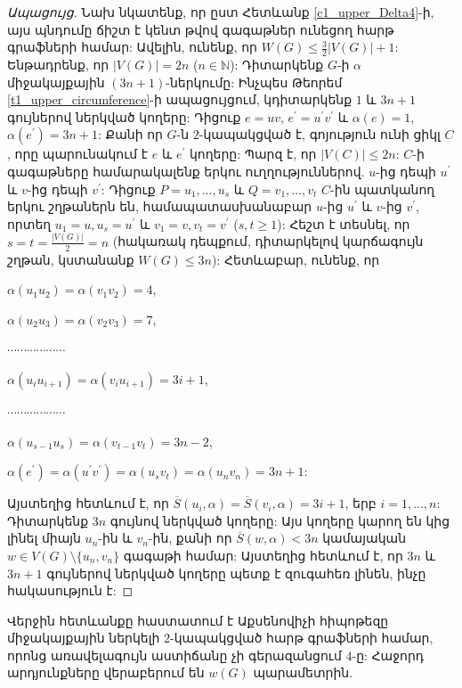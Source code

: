 \begin{proof}[Ապացույց] Նախ նկատենք, որ ըստ Հետևանք \ref{c1_upper_Delta4}-ի, այս պնդումը ճիշտ է կենտ թվով գագաթներ ունեցող հարթ գրաֆների համար: Ավելին, ունենք, որ $W(G)\leq \frac{3}{2}\vert V(G)\vert+1$: Ենթադրենք, որ $\vert V(G)\vert =2n$ ($n\in \mathbb{N}$): Դիտարկենք $G$-ի $\alpha$ միջակայքային $(3n+1)$-ներկումը:
Ինչպես Թեորեմ \ref{t1_upper_circumference}-ի ապացույցում, կդիտարկենք $1$ և $3n+1$ գույներով ներկված կողերը: Դիցուք $e=uv$, $e^{\prime}=u^{\prime}v^{\prime}$ և $\alpha(e)=1$,
$\alpha(e^{\prime})=3n+1$: Քանի որ $G$-ն $2$-կապակցված է, գոյություն ունի ցիկլ $C$, որը պարունակում է $e$ և $e^{\prime}$ կողերը: 
Պարզ է, որ $\vert V(C)\vert\leq 2n$: 
$C$-ի գագաթները համարակալենք երկու ուղղություններով. $u$-ից դեպի
$u^{\prime}$ և $v$-ից դեպի $v^{\prime}$: Դիցուք
$P=u_{1},\ldots,u_{s}$ և $Q=v_{1},\ldots,v_{t}$ $C$-ին պատկանող երկու շղթաներն են, համապատասխանաբար $u$-ից $u^{\prime}$ և $v$-ից $v^{\prime}$, որտեղ
$u_{1}=u,u_{s}=u^{\prime}$ և $v_{1}=v,v_{t}=v^{\prime}$
($s,t\geq 1$): Հեշտ է տեսնել, որ
$s=t=\frac{\vert V(G)\vert}{2}=n$ (հակառակ դեպքում, դիտարկելով կարճագույն շղթան, կստանանք $W(G)\leq 3n$): Հետևաբար, ունենք, որ

\begin{center}
$\alpha(u_{1}u_{2})=\alpha(v_{1}v_{2})=4$,

$\alpha(u_{2}u_{3})=\alpha(v_{2}v_{3})=7$,

$\cdots \cdots \cdots \cdots \cdots \cdots$

$\alpha(u_{i}u_{i+1})=\alpha(v_{i}u_{i+1})=3i+1$,

$\cdots \cdots \cdots \cdots \cdots \cdots$

$\alpha(u_{s-1}u_{s})=\alpha(v_{t-1}v_{t})=3n-2$,

$\alpha(e^{\prime})=\alpha(u^{\prime}v^{\prime})=\alpha(u_{s}v_{t})=\alpha(u_{n}v_{n})=3n+1$:
\end{center}

Այստեղից հետևում է, որ $\overline S\left(u_{i},\alpha\right)=\overline
S\left(v_{i},\alpha\right)=3i+1$, երբ $i=1,\ldots,n$: Դիտարկենք $3n$ գույնով ներկված կողերը: Այս կողերը կարող են կից լինել միայն $u_{n}$-ին և $v_{n}$-ին, քանի որ 
$\overline S\left(w,\alpha\right)<3n$ կամայական 
$w\in V(G)\setminus\{u_{n},v_{n}\}$ գագաթի համար: Այստեղից հետևում է, որ $3n$ և $3n+1$ գույներով ներկված կողերը պետք է զուգահեռ լինեն, ինչը հակասություն է:
\end{proof}

Վերջին հետևանքը հաստատում է Աքսենովիչի  հիպոթեզը միջակայքային ներկելի $2$-կապակցված հարթ գրաֆների համար, որոնց առավելագույն աստիճանը չի գերազանցում $4$-ը: Հաջորդ արդյունքները վերաբերում են $w(G)$ պարամետրին.

